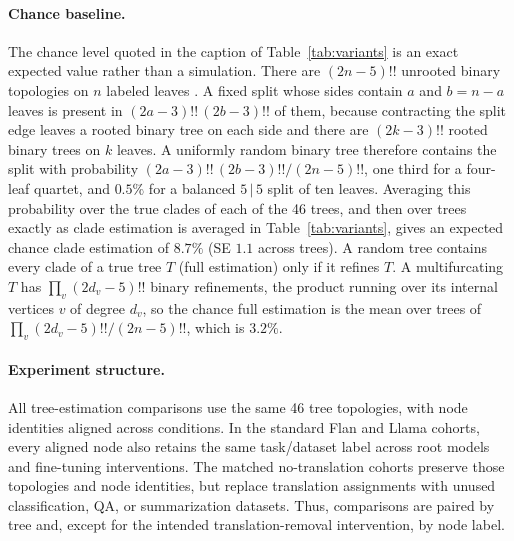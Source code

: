 \documentclass{article}
\theoremstyle{definition}
\theoremstyle{plain}
\begin{document}
\paragraph{Chance baseline.} The chance level quoted in the caption of Table~\ref{tab:variants} is an
exact expected value rather than a simulation. There are $(2n-5)!!$ unrooted binary topologies on $n$
labeled leaves \citep{sempleSteel2003phylogenetics}. A fixed split whose sides contain $a$ and
$b=n-a$ leaves is present in $(2a-3)!!\,(2b-3)!!$ of them, because contracting the split edge
leaves a rooted binary tree on each side and there are $(2k-3)!!$ rooted binary trees on $k$ leaves.
A uniformly random binary tree therefore contains the split with probability
$(2a-3)!!\,(2b-3)!!/(2n-5)!!$, one third for a four-leaf quartet, and $0.5\%$ for a balanced
$5\,|\,5$ split of ten leaves. Averaging this probability over the true clades of each of the 46
trees, and then over trees exactly as clade estimation is averaged in
Table~\ref{tab:variants}, gives an expected chance clade estimation of $8.7\%$ (SE $1.1$ across
trees). A random tree contains every clade of a true tree $T$ (full estimation) only if it refines $T$. A
multifurcating $T$ has $\prod_v (2d_v-5)!!$ binary refinements, the product running over its
internal vertices $v$ of degree $d_v$, so the chance full estimation is the mean over trees of
$\prod_v (2d_v-5)!!/(2n-5)!!$, which is $3.2\%$.

\paragraph{Experiment structure.} All tree-estimation comparisons use the same 46
tree topologies, with node identities aligned across conditions. In the standard Flan
and Llama cohorts, every aligned node also retains the same task/dataset label across root models
and fine-tuning interventions. The matched no-translation cohorts preserve those topologies
and node identities, but replace translation assignments with unused classification, QA, or
summarization datasets. Thus, comparisons are paired by tree and,
except for the intended translation-removal intervention, by node label.
\end{document}
